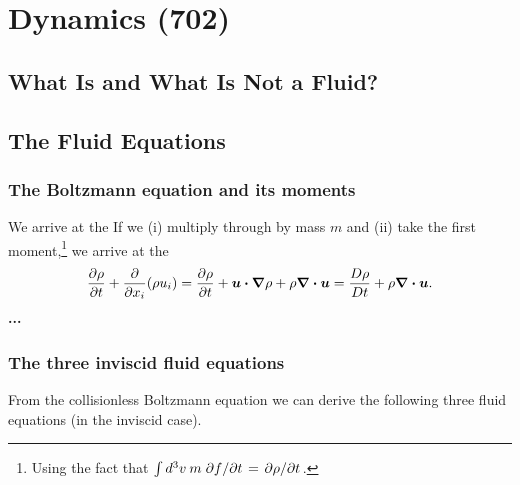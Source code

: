 \chapter{Dynamics (702)}



\section{What Is and What Is Not a Fluid?}


\section{The Fluid Equations}
\subsection{The Boltzmann equation and its moments}
We arrive at the 
If we (i) multiply through by mass $m$ and (ii) take the first moment,\footnote{Using the fact that $\int d^3v \: m \pdv*{f}{t} = \pdv*{\rho}{t}$.} we arrive at the 
\begin{equation}
    \pdv{\rho}{t} + \pdv{x_i} (\rho u_i) = \pdv{\rho}{t} + \vb*{u} \vdot \grad{\rho} + \rho \div{\vb*{u}} = \mdv{\rho} + \rho \div{\vb*{u}}.
\end{equation}
\textbf{...}

\subsection{The three inviscid fluid equations}
From the collisionless Boltzmann equation we can derive the following three fluid equations (in the inviscid case).


